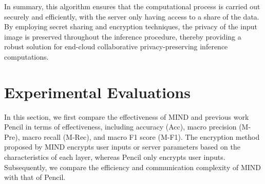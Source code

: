 \documentclass[conference]{IEEEtran}
\newcommand{\DEnc}{\texttt{DEnc}}
\newcommand{\PEnc}{\texttt{PEnc}}
\begin{document}


In summary, this algorithm ensures that the computational process is carried out securely and efficiently, with the server only having access to a share of the data. By employing secret sharing and encryption techniques, the privacy of the input image is preserved throughout the inference procedure, thereby providing a robust solution for end-cloud collaborative privacy-preserving inference computations.



\section{Experimental Evaluations}

In this section, we first compare the effectiveness of MIND and previous work Pencil \cite{liu2024pencilprivateextensiblecollaborative} in terms of effectiveness, including accuracy (Acc), macro precision (M-Pre), macro recall (M-Rec), and macro F1 score (M-F1).
The encryption method proposed by MIND encrypts user inputs or server parameters based on the characteristics of each layer, whereas Pencil only encrypts user inputs.
Subsequently, we compare the efficiency and communication complexity of MIND with that of Pencil.
\end{document}
